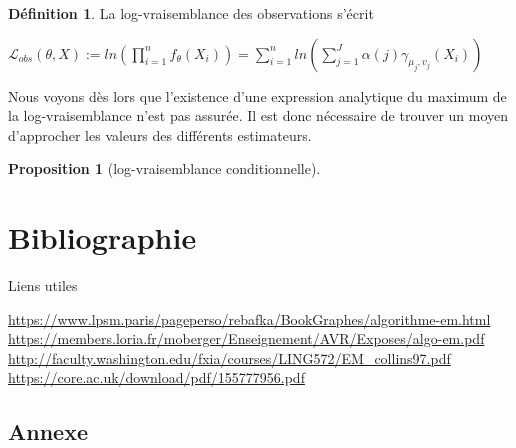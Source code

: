\documentclass[frenchb]{report}
\newcommand{\1}{\mathbbm{1}}
\newtheorem{prop}{Proposition}
\theoremstyle{definition}\newtheorem{defn}{Définition}
\theoremstyle{definition}\newtheorem{exm}{Exemple}
\theoremstyle{definition}\newtheorem{nota}{Notation}
\theoremstyle{definition}\newtheorem{rem}{Remarque}
\begin{document}
\begin{defn} 
La log-vraisemblance des observations s'écrit 
\begin{center} $\mathcal{L}_{obs}(\theta,X) := ln\left( \displaystyle\prod_{i=1}^n f_\theta(X_i) \right) = \displaystyle\sum_{i=1}^nln\left( \sum_{j=1}^J \alpha(j) \gamma_{\mu_j, v_j}(X_i) \right)$ \end{center}
\end{defn}

Nous voyons dès lors que l'existence d'une expression analytique du maximum de la log-vraisemblance n'est pas assurée. Il est donc nécessaire de trouver un moyen d'approcher les valeurs des différents estimateurs.


\begin{prop}[log-vraisemblance conditionnelle]

\end{prop}


\pagebreak



\chapter*{Bibliographie}
 
Liens utiles

\url{https://www.lpsm.paris/pageperso/rebafka/BookGraphes/algorithme-em.html} \newline
\url{https://members.loria.fr/moberger/Enseignement/AVR/Exposes/algo-em.pdf} \newline
\url{http://faculty.washington.edu/fxia/courses/LING572/EM_collins97.pdf}\newline
\url{https://core.ac.uk/download/pdf/155777956.pdf}


\pagebreak
\begin{appendix}
\chapter{Annexe}

\end{appendix}
\end{document}
